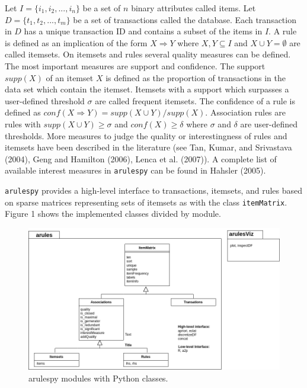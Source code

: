 \documentclass{article}
\begin{document}
Let \(I = \{i_1,i_2,...,i_n\}\) be a set of \(n\) binary attributes
called items. Let \(D = \{t_1,t_2,...,t_m\}\) be a set of transactions
called the database. Each transaction in \(D\) has a unique transaction
ID and contains a subset of the items in \(I\). A rule is defined as an
implication of the form \(X \Rightarrow Y\) where \(X,Y \subseteq I\)
and \(X \cup Y = \emptyset\) are called itemsets. On itemsets and rules
several quality measures can be defined. The most important measures are
support and confidence. The support \(supp(X)\) of an itemset \(X\) is
defined as the proportion of transactions in the data set which contain
the itemset. Itemsets with a support which surpasses a user-defined
threshold \(\sigma\) are called frequent itemsets. The confidence of a
rule is defined as \(conf(X \Rightarrow Y) = supp(X \cup Y)/supp(X)\).
Association rules are rules with \(supp(X \cup Y) \ge \sigma\) and
\(conf(X) \ge \delta\) where \(\sigma\) and \(\delta\) are user-defined
thresholds. More measures to judge the quality or interestingness of
rules and itemsets have been described in the literature (see Tan,
Kumar, and Srivastava (2004), Geng and Hamilton (2006), Lenca et al.
(2007)). A complete list of available interest measures in
\texttt{arulespy} can be found in Hahsler (2005).

\texttt{arulespy} provides a high-level interface to transactions,
itemsets, and rules based on sparse matrices representing sets of
itemsets as with the class \texttt{itemMatrix}. Figure 1 shows the
implemented classes divided by module.

\begin{figure}

{\centering \includegraphics[width=0.9\linewidth]{classes} 

}

\caption{arulespy modules with Python classes.}\label{fig:classes}
\end{figure}
\end{document}
